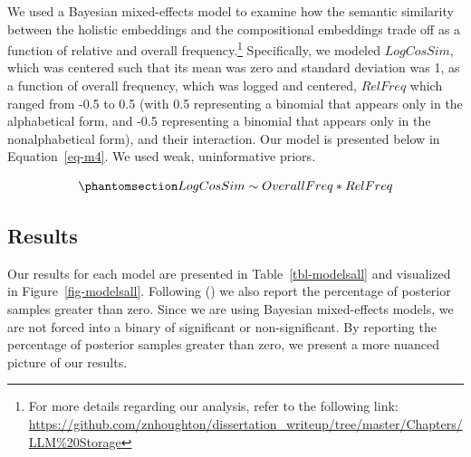 \documentclass[
  12pt,
  letterpaper,
]{scrreport}
\begin{document}
We used a Bayesian mixed-effects model to examine how the semantic
similarity between the holistic embeddings and the compositional
embeddings trade off as a function of relative and overall
frequency.\footnote{For more details regarding our analysis, refer to
  the following link:
  \url{https://github.com/znhoughton/dissertation_writeup/tree/master/Chapters/LLM\%20Storage}}
Specifically, we modeled \(LogCosSim\), which was centered such that its
mean was zero and standard deviation was 1, as a function of overall
frequency, which was logged and centered, \(RelFreq\) which ranged from
-0.5 to 0.5 (with 0.5 representing a binomial that appears only in the
alphabetical form, and -0.5 representing a binomial that appears only in
the nonalphabetical form), and their interaction. Our model is presented
below in Equation~\ref{eq-m4}. We used weak, uninformative priors.

\begin{equation}\phantomsection\label{eq-m4}{
LogCosSim \sim OverallFreq*RelFreq
}\end{equation}

\subsection{Results}\label{results-8}

Our results for each model are presented in Table~\ref{tbl-modelsall}
and visualized in Figure~\ref{fig-modelsall}. Following
() we also report the percentage of posterior samples
greater than zero. Since we are using Bayesian mixed-effects models, we
are not forced into a binary of significant or non-significant. By
reporting the percentage of posterior samples greater than zero, we
present a more nuanced picture of our results.
\end{document}
